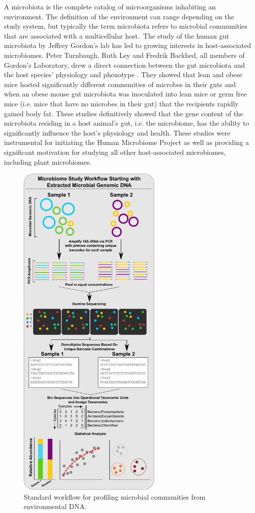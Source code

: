 A microbiota is the complete catalog of microorganisms inhabiting an environment. The definition of the environment can range depending on the study system, but typically the term microbiota refers to microbial communities that are associated with a multicellular host. The study of the human gut microbiota by Jeffrey Gordon's lab has led to growing interests in host-associated microbiomes. Peter Turnbaugh, Ruth Ley and Fredrik Backhed, all members of Gordon's Laboratory, drew a direct connection between the gut microbiota and the host species' physiology and phenotype \cite{Turnbaugh,Backhed,Ley2005}. They showed that lean and obese mice hosted significantly different communities of microbes in their guts and when an obese mouse gut microbiota was inoculated into lean mice or germ free mice (i.e. mice that have no microbes in their gut) that the recipients rapidly gained body fat. These studies definitively showed that the gene content of the microbiota residing in a host animal's gut, i.e. the microbiome, has the ability to significantly influence the host's physiology and health. These studies were instrumental for initiating the Human Microbiome Project \cite{Turnbaugh2007} as well as providing a significant motivation for studying all other host-associated microbiomes, including plant microbiomes.

\begin{figure}[tbh]
\centering
\includegraphics[width=2.75in]{Figures/intro_fig2}
\caption[Figure 1.2]{Standard workflow for profiling microbial communities from environmental DNA.}
\label{Figure 1.2}
\end{figure}

